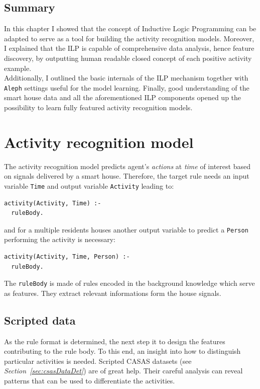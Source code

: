 \documentclass[10pt, a4paper, pdflatex, leqno, twoside, openright]{report}
\begin{document}
  \section{Summary}
In this chapter I showed that the concept of Inductive Logic Programming can be adapted to serve as a tool for building the activity recognition models. Moreover, I explained that the ILP is capable of comprehensive data analysis, hence feature discovery, by outputting human readable closed concept of each positive activity example.\\
Additionally, I outlined the basic internals of the ILP mechanism together with \texttt{Aleph} settings useful for the model learning. Finally, good understanding of the smart house data and all the aforementioned ILP components opened up the possibility to learn fully featured activity recognition models.


\chapter{Activity recognition model}
The activity recognition model predicts agent's \emph{actions} at \emph{time} of interest based on signals delivered by a smart house. Therefore, the target rule needs an input variable \texttt{Time} and output variable \texttt{Activity} leading to:\\
\begin{verbatim}
activity(Activity, Time) :-
  ruleBody.
\end{verbatim}
and for a multiple residents houses another output variable to predict a \texttt{Person} performing the activity is necessary:\\
\begin{verbatim}
activity(Activity, Time, Person) :-
  ruleBody.
\end{verbatim}
The \texttt{ruleBody} is made of rules encoded in the background knowledge which serve as features. They extract relevant informations form the house signals.

  \section{Scripted data} %
As the rule format is determined, the next step it to design the features contributing to the rule body. To this end, an insight into how to distinguish particular activities is needed. Scripted CASAS datasets (see \emph{Section~\ref{sec:csasDataDet}}) are of great help. Their careful analysis can reveal patterns that can be used to differentiate the activities.
\end{document}
